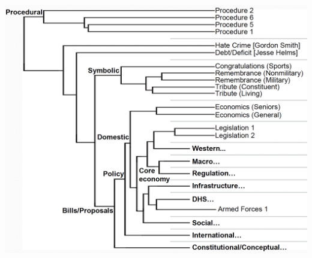 \documentclass[english]{beamer}
\begin{document}
\begin{frame}{}
    \centering
\includegraphics[width=0.8 \textwidth]{Images/procedures.png}
\end{frame}
\end{document}

